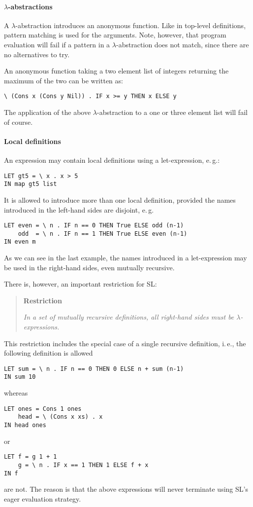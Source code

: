 \documentclass{article}
\begin{document}
\paragraph{$\lambda$-abstractions}
\label{sec:lambda-abstractions}

A $\lambda$-abstraction introduces an anonymous function. Like in
top-level definitions, pattern matching is used for the
arguments. Note, however, that program evaluation will fail if a
pattern in a $\lambda$-abstraction does not match, since there are no
alternatives to try.

An anonymous function taking a two element list of integers returning
the maximum of the two can be written as:
\begin{verbatim}
\ (Cons x (Cons y Nil)) . IF x >= y THEN x ELSE y
\end{verbatim}
The application of the above $\lambda$-abstraction to a one or three
element list will fail of course.


\paragraph{Local definitions}
\label{sec:local-definitions}

An expression may contain local definitions using a let-expression,
e.\,g.:
\begin{verbatim}
LET gt5 = \ x . x > 5
IN map gt5 list
\end{verbatim}
It is allowed to introduce more than one local definition, provided
the names introduced in the left-hand sides are disjoint, e.\,g.
\begin{verbatim}
LET even = \ n . IF n == 0 THEN True ELSE odd (n-1)
    odd  = \ n . IF n == 1 THEN True ELSE even (n-1)
IN even m
\end{verbatim}
As we can see in the last example, the names introduced in a
let-expression may be used in the right-hand sides, even mutually
recursive.

There is, however, an important restriction for SL:
\begin{quote}
  \label{restriction}
  \textbf{Restriction}

\emph{In a set of mutually recursive definitions, all right-hand sides
  must be $\lambda$-expressions.}
\end{quote}

This restriction includes the special case of a single recursive
definition, i.\,e., the following definition is allowed
\begin{verbatim}
LET sum = \ n . IF n == 0 THEN 0 ELSE n + sum (n-1)
IN sum 10
\end{verbatim}
whereas
\begin{verbatim}
LET ones = Cons 1 ones
    head = \ (Cons x xs) . x
IN head ones
\end{verbatim}
or
\begin{verbatim}
LET f = g 1 + 1
    g = \ n . IF x == 1 THEN 1 ELSE f + x
IN f
\end{verbatim}
are not. The reason is that the above expressions will never terminate
using SL's eager evaluation strategy.
\end{document}
